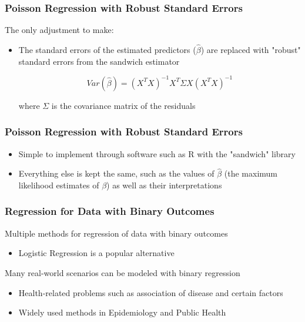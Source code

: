\documentclass{beamer}
\begin{document}
\begin{frame}[fragile]\frametitle{Poisson Regression with Robust Standard Errors}
	
	The only adjustment to make:	
	
	\begin{itemize}
		
		\item The standard errors of the estimated predictors ($\hat{\beta}$) are replaced with "robust" standard errors from the sandwich estimator 
		
		$$ Var(\hat{\beta}) = (X^{T}X)^{-1}X^{T} \Sigma X(X^{T}X)^{-1} $$
		
		where $\Sigma$ is the covariance matrix of the residuals			
		
	\end{itemize}	
	
\end{frame}



\begin{frame}[fragile]\frametitle{Poisson Regression with Robust Standard Errors}
	
	\begin{itemize}
		
		\item Simple to implement through software such as R with the "sandwich" library

		\item Everything else is kept the same, such as the values of $\hat{\beta}$ (the maximum likelihood estimates of $\beta$) as well as their interpretations

	\end{itemize}
	
\end{frame}



\begin{frame}[fragile]\frametitle{Regression for Data with Binary Outcomes}

	Multiple methods for regression of data with binary outcomes
	
	\begin{itemize}
	
		\item Logistic Regression is a popular alternative
	
	\end{itemize}
	
	Many real-world scenarios can be modeled with binary regression
	
	\begin{itemize}
	
		\item Health-related problems such as association of disease and certain factors
		
		\item Widely used methods in Epidemiology and Public Health
	
	\end{itemize}
	
\end{frame}
\end{document}
